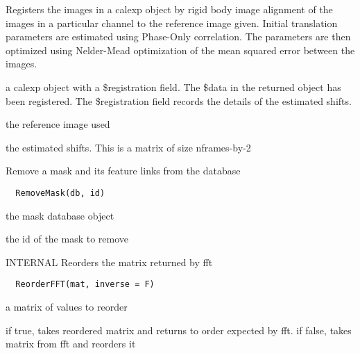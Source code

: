 \documentclass[a4paper]{book}
\begin{document}
%
\begin{Details}\relax
Registers the images in a calexp object by rigid body
image alignment of the images in a particular channel to
the reference image given.  Initial translation
parameters are estimated using Phase-Only correlation.
The parameters are then optimized using Nelder-Mead
optimization of the mean squared error between the
images.
\end{Details}
%
\begin{Value}
a calexp object with a \bsl{}\$registration field.  The \bsl{}\$data
in the returned object has been registered.  The
\bsl{}\$registration field records the details of the estimated
shifts.  \begin{ldescription}
\item[\code{refimg}] the reference image used
\item[\code{mpars}] the estimated shifts. This is a matrix of
size nframes-by-2
\end{ldescription}
\end{Value}
%
\begin{Description}\relax
Remove a mask and its feature links from the database
\end{Description}
%
\begin{Usage}
\begin{verbatim}
  RemoveMask(db, id)
\end{verbatim}
\end{Usage}
%
\begin{Arguments}
\begin{ldescription}
\item[\code{db}] the mask database object

\item[\code{id}] the id of the mask to remove
\end{ldescription}
\end{Arguments}
%
\begin{Description}\relax
INTERNAL Reorders the matrix returned by fft
\end{Description}
%
\begin{Usage}
\begin{verbatim}
  ReorderFFT(mat, inverse = F)
\end{verbatim}
\end{Usage}
%
\begin{Arguments}
\begin{ldescription}
\item[\code{mat}] a matrix of values to reorder

\item[\code{inverse}] if true, takes reordered matrix and
returns to order expected by fft. if false, takes matrix
from fft and reorders it
\end{ldescription}
\end{Arguments}
\end{document}
